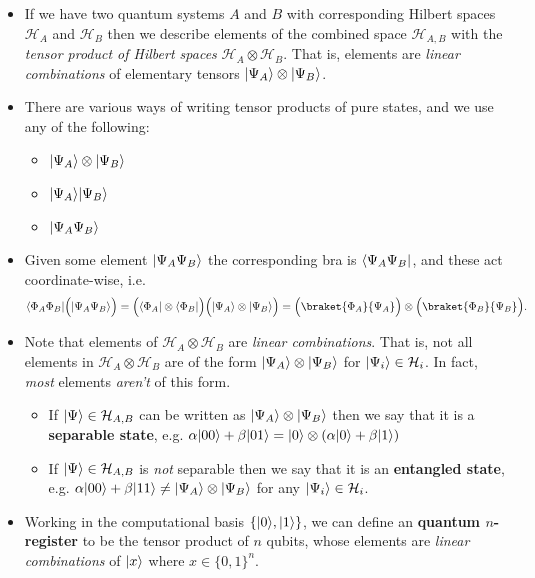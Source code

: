 \documentclass[10pt]{article}
\DeclarePairedDelimiter\bra{\langle}{\rvert}
\DeclarePairedDelimiter\ket{\lvert}{\rangle}
\newcommand{\hilb}{\mathcal{H}}
\begin{document}
            \begin{itemize}
                \item If we have two quantum systems $A$ and $B$ with corresponding Hilbert spaces $\hilb_A$ and $\hilb_B$ then we describe elements of the combined space $\hilb_{A,B}$ with the \emph{tensor product of Hilbert spaces} $\hilb_A\otimes\hilb_B$.
                    That is, elements are \emph{linear combinations} of elementary tensors $\ket{\Psi_A}\otimes\ket{\Psi_B}$.
                \item There are various ways of writing tensor products of pure states, and we use any of the following:
                    \begin{itemize}
                        \item $\ket{\Psi_A}\otimes\ket{\Psi_B}$
                        \item $\ket{\Psi_A}\ket{\Psi_B}$
                        \item $\ket{\Psi_A\Psi_B}$
                    \end{itemize}
                \item Given some element $\ket{\Psi_A\Psi_B}$ the corresponding bra is $\bra{\Psi_A\Psi_B}$, and these act coordinate-wise, i.e.
                    \begin{equation*}
                        \bra{\Phi_A\Phi_B}\Big(\ket{\Psi_A\Psi_B}\Big) = \Big(\bra{\Phi_A}\otimes\bra{\Phi_B}\Big)\Big(\ket{\Psi_A}\otimes\ket{\Psi_B}\Big) = \Big(\braket{\Phi_A}{\Psi_A}\Big)\otimes\Big(\braket{\Phi_B}{\Psi_B}\Big).
                    \end{equation*}
                \item Note that elements of $\hilb_A\otimes\hilb_B$ are \emph{linear combinations}.
                    That is, not all elements in $\hilb_A\otimes\hilb_B$ are of the form $\ket{\Psi_A}\otimes\ket{\Psi_B}$ for $\ket{\Psi_i}\in\hilb_i$.
                    In fact, \emph{most} elements \emph{aren't} of this form.
                    \begin{itemize}
                        \item If $\ket{\Psi}\in\hilb_{A,B}$ can be written as $\ket{\Psi_A}\otimes\ket{\Psi_B}$ then we say that it is a \textbf{separable state}, e.g. $\alpha\ket{00}+\beta\ket{01}=\ket{0}\otimes(\alpha\ket{0}+\beta\ket{1})$
                        \item If $\ket{\Psi}\in\hilb_{A,B}$ is \emph{not} separable then we say that it is an \textbf{entangled state}, e.g. $\alpha\ket{00}+\beta\ket{11}\neq\ket{\Psi_A}\otimes\ket{\Psi_B}$ for any $\ket{\Psi_i}\in\hilb_i$.
                    \end{itemize}
                \item Working in the computational basis $\{\ket{0},\ket{1}\}$, we can define an \textbf{quantum $n$-register} to be the tensor product of $n$ qubits, whose elements are \emph{linear combinations} of $\ket{x}$ where $x\in\{0,1\}^n$.
            \end{itemize}
\end{document}
